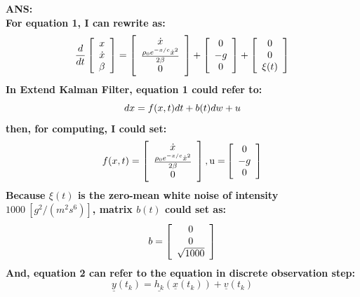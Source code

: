 \documentclass{article}
\begin{document}
\bf{ANS:}\\
For equation 1, I can rewrite as:
\begin{equation}
\frac{d}{{dt}}\left[ {\begin{array}{*{20}c}
   x  \\
   {\dot x}  \\
   \beta   \\
\end{array}} \right] = \left[ {\begin{array}{*{20}c}
   {\dot x}  \\
   {\frac{{\rho _0 e^{ - x/c} \dot x^2 }}{{2\beta }}}  \\
   0  \\
\end{array}} \right] + \left[ {\begin{array}{*{20}c}
   0  \\
   { - g}  \\
   0  \\
\end{array}} \right] + \left[ {\begin{array}{*{20}c}
   0  \\
   0  \\
   {\xi (t)}  \\
\end{array}} \right]
\end{equation}
In Extend Kalman Filter, equation 1 could refer to:
\begin{equation}
    dx=f(x,t)dt+b(t)dw+u\\
\end{equation}
then, for computing, I could set:
\begin{equation}
	f(x,t) = \left[ {\begin{array}{*{20}c}
	   {\dot x}  \\
	   {\frac{{\rho _0 e^{ - x/c} \dot x^2 }}{{2\beta }}}  \\
	   0  \\
	\end{array}} \right],{\rm{  u = }}\left[ {\begin{array}{*{20}c}
	   0  \\
	   { - g}  \\
	   0  \\
	\end{array}} \right]
\end{equation}
Because $\xi (t)$ is the zero-mean white noise of intensity $1000\  [g^2/(m^2 s^6)]$, matrix $b(t)$ could set as:
\begin{equation}
	b = \left[ {\begin{array}{*{20}c}
	   0  \\
	   0  \\
	   {\sqrt {1000} }  \\
	\end{array}} \right]
\end{equation}
And, equation 2 can refer to the equation in discrete observation step:
\begin{equation}
	\underline{y}(t_k)=\underline{h_k}(\underline{x}(t_k))+\underline{v}(t_k)
\end{equation}
\end{document}

